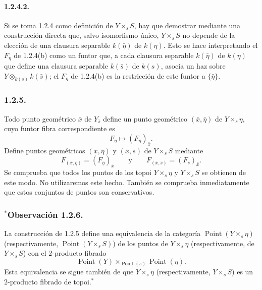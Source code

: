 \paragraph{1.2.4.2.}
Si se toma 1.2.4 como definición de $Y\times_sS$, hay que demostrar mediante
una construcción directa que, salvo isomorfismo único, $Y\times_sS$ no
depende de la elección de una clausura separable $k(\bar\eta)$ de $k(\eta)$.
Esto se hace interpretando el $F_\eta$ de 1.2.4(b) como un funtor que, a cada
clausura separable $k(\bar\eta)$ de $k(\eta)$ que define una clausura
separable $k(\bar s)$ de $k(s)$, asocia un haz sobre
$Y\otimes_{k(s)}k(\bar s)$; el $F_\eta$ de 1.2.4(b) es la restricción de este
funtor a $\{\bar\eta\}$.

\pageoriginale

\subsubsection*{1.2.5.}
Todo punto geométrico $\bar x$ de $Y_{\bar s}$ define un punto geométrico
$(\bar x,\bar\eta)$ de $Y\times_s\eta$, cuyo funtor fibra correspondiente es
\begin{equation*}
F_\eta\longmapsto(F_{\bar\eta})_{\bar x}.
\end{equation*}
Define puntos geométricos $(\bar x,\bar\eta)$ y $(\bar x,\bar s)$ de
$Y\times_sS$ mediante
\begin{equation*}
F_{(\bar x,\bar\eta)}=(F_{\bar\eta})_{\bar x}
\qquad\text{y}\qquad
F_{(\bar x,\bar s)}=(F_{\bar s})_{\bar x}.
\end{equation*}
Se comprueba que todos los puntos de los topoi $Y\times_s\eta$ y
$Y\times_sS$ se obtienen de este modo. No utilizaremos este hecho. También se
comprueba inmediatamente que estos conjuntos de puntos son conservativos.

\subsubsection*{\texorpdfstring{${}^{*}$Observación 1.2.6.}{Observación 1.2.6.}}
La construcción de 1.2.5 define una equivalencia de la categoría
$\operatorname{Point}(Y\times_s\eta)$ (respectivamente,
$\operatorname{Point}(Y\times_sS)$) de los puntos de $Y\times_s\eta$
(respectivamente, de $Y\times_sS$) con el $2$-producto fibrado
\begin{equation*}
\operatorname{Point}(Y)\times_{\operatorname{Point}(s)}
\operatorname{Point}(\eta).
\end{equation*}
Esta equivalencia se sigue también de que $Y\times_s\eta$ (respectivamente,
$Y\times_sS$) es un $2$-producto fibrado de topoi.${}^{*}$

